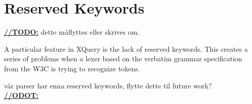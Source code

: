 \section{Reserved Keywords}
\label{sect:impl:reserved_keywords}

\underline{\textbf{\LARGE //TODO:}} dette m\aa flyttes eller skrives om.

A particular feature in XQuery is the lack of reserved keywords. This creates a
series of problems when a lexer based on the verbatim grammar specification from
the W3C is trying to recognize tokens. 

v\aa r parser har enna reserved keywords, flytte dette til future work? \\
\underline{\textbf{\LARGE //ODOT:}} 